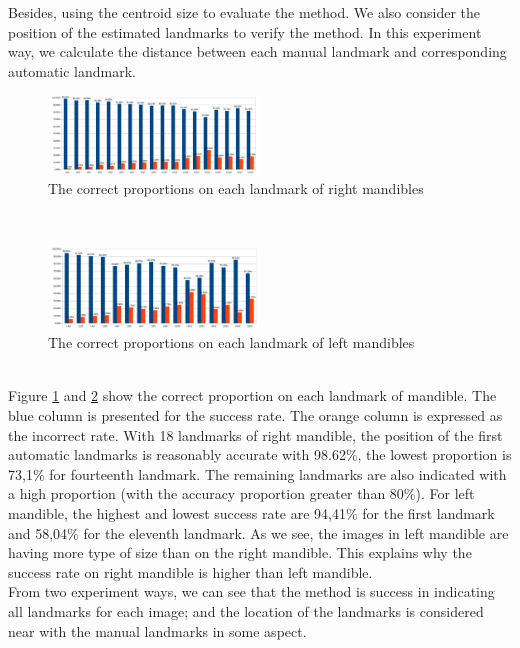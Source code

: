 \documentclass[twoside,twocolumn,10pt]{article}
\begin{document}
Besides, using the centroid size to evaluate the method. We also
consider the position of the estimated landmarks to verify the method. In this experiment
way, we calculate the distance between each manual landmark and
corresponding automatic landmark.
\begin{figure}[htb]
    \centering
    \includegraphics[width=0.5\textwidth]{./images/md_chartlms}
    \caption{The correct proportions on each landmark of right mandibles }
    \label{figmdresultlm}
\end{figure}~\\
\begin{figure}[htb]
    \centering
    \includegraphics[width=0.5\textwidth]{./images/mg_chartlms}
    \caption{The correct proportions on each landmark of left mandibles }
    \label{figmgresultlm}
\end{figure}~\\
Figure \ref{figmdresultlm} and \ref{figmgresultlm} show the correct proportion on each landmark of mandible. The blue column is presented for the success rate. The orange column is expressed as the incorrect rate. With 18 landmarks of right mandible, the position of the first automatic landmarks is reasonably accurate with 98.62\%, the lowest proportion is 73,1\% for fourteenth landmark. The remaining landmarks are also indicated with a high proportion (with the accuracy proportion greater than 80\%). For left mandible, the highest and lowest success rate are 94,41\% for the first landmark and 58,04\% for the eleventh landmark. As we see, the images in left mandible are having more type of size than on the right mandible. This explains why the success rate on right mandible is higher than left mandible.\\

From two experiment ways, we can see that the method is success in
indicating all landmarks for each image; and the location of the
landmarks is considered near with the manual landmarks in some
aspect.\\
\end{document}
